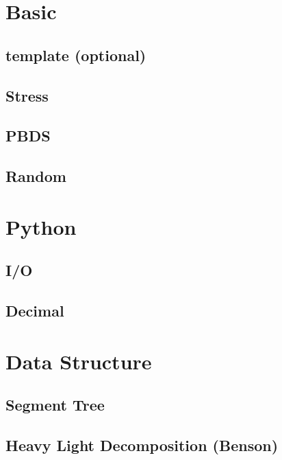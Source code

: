 \documentclass[a4paper,10pt,twocolumn,oneside]{article}
\begin{document}
\section{Basic}

\subsection{template (optional)}


\subsection{Stress}


\subsection{PBDS}


\subsection{Random}


\section{Python}
\subsection{I/O}


\subsection{Decimal}




\section{Data Structure}

\subsection{Segment Tree}


\subsection{Heavy Light Decomposition (Benson)}

\end{document}
